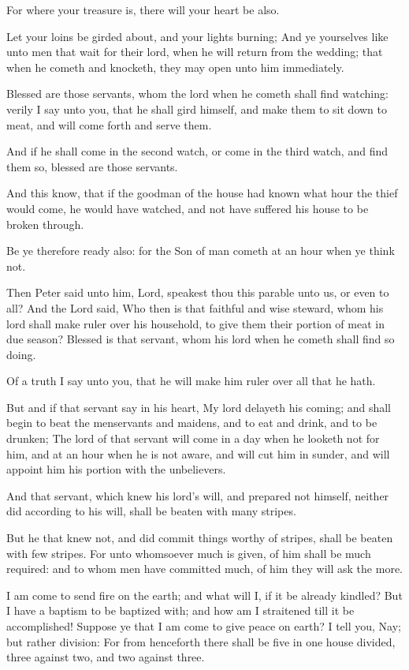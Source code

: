 \Verse For where your treasure is, there will your heart be also.

\Verse Let your loins be girded about, and your lights burning; \Verse And ye yourselves like unto men that wait for their lord, when he will return from the wedding; that when he cometh and knocketh, they may open unto him immediately.

\Verse Blessed are those servants, whom the lord when he cometh shall find watching: verily I say unto you, that he shall gird himself, and make them to sit down to meat, and will come forth and serve them.

\Verse And if he shall come in the second watch, or come in the third watch, and find them so, blessed are those servants.

\Verse And this know, that if the goodman of the house had known what hour the thief would come, he would have watched, and not have suffered his house to be broken through.

\Verse Be ye therefore ready also: for the Son of man cometh at an hour when ye think not.

\Verse Then Peter said unto him, Lord, speakest thou this parable unto us, or even to all?  \Verse And the Lord said, Who then is that faithful and wise steward, whom his lord shall make ruler over his household, to give them their portion of meat in due season?  \Verse Blessed is that servant, whom his lord when he cometh shall find so doing.

\Verse Of a truth I say unto you, that he will make him ruler over all that he hath.

\Verse But and if that servant say in his heart, My lord delayeth his coming; and shall begin to beat the menservants and maidens, and to eat and drink, and to be drunken; \Verse The lord of that servant will come in a day when he looketh not for him, and at an hour when he is not aware, and will cut him in sunder, and will appoint him his portion with the unbelievers.

\Verse And that servant, which knew his lord's will, and prepared not himself, neither did according to his will, shall be beaten with many stripes.

\Verse But he that knew not, and did commit things worthy of stripes, shall be beaten with few stripes. For unto whomsoever much is given, of him shall be much required: and to whom men have committed much, of him they will ask the more.

\Verse I am come to send fire on the earth; and what will I, if it be already kindled?  \Verse But I have a baptism to be baptized with; and how am I straitened till it be accomplished!  \Verse Suppose ye that I am come to give peace on earth? I tell you, Nay; but rather division: \Verse For from henceforth there shall be five in one house divided, three against two, and two against three.

